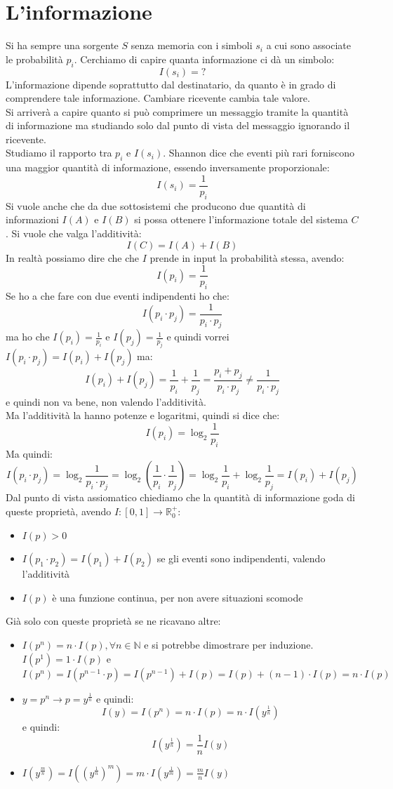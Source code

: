 \documentclass[a4paper,12pt, oneside]{book}
\begin{document}
\section{L'informazione}
Si ha sempre una sorgente $S$ senza memoria con i simboli $s_i$ a cui sono
associate le probabilità $p_i$. Cerchiamo di capire quanta informazione ci dà un
simbolo:
\[I(s_i)=?\]
L'informazione dipende soprattutto dal destinatario, da quanto è in grado di
comprendere tale informazione. Cambiare ricevente cambia tale valore.\\
Si arriverà a capire quanto si può comprimere un messaggio tramite la quantità
di informazione ma studiando solo dal punto di vista del messaggio ignorando il
ricevente.\\
Studiamo il rapporto tra $p_i$ e $I(s_i)$. Shannon dice che eventi più rari
forniscono una maggior quantità di informazione, essendo inversamente
proporzionale: 
\[I(s_i)=\frac{1}{p_i}\]
Si vuole anche che da due sottosistemi che producono due quantità di
informazioni $I(A)$ e $I(B)$ si possa ottenere l'informazione totale del
sistema $C$. Si vuole che valga l'additività:
\[I(C)=I(A)+I(B)\]
In realtà possiamo dire che che $I$ prende in input la probabilità stessa,
avendo:
\[I(p_i)=\frac{1}{p_i}\]
Se ho a che fare con due eventi indipendenti ho che:
\[I(p_i\cdot p_j)=\frac{1}{p_i\cdot p_j}\]
ma ho che $I(p_i)=\frac{1}{p_i}$ e $I(p_j)=\frac{1}{p_j}$ e quindi vorrei
$I(p_i\cdot p_j)=I(p_i)+I(p_j)$ ma:
\[I(p_i)+I(p_j)=\frac{1}{p_i}+\frac{1}{p_j}=\frac{p_i+p_j}{p_i\cdot p_j}\neq
  \frac{1}{p_i\cdot p_j}\]
e quindi non va bene, non valendo l'additività.\\
Ma l'additività la hanno potenze e logaritmi, quindi si dice che:
\[I(p_i)=\log_2\frac{1}{p_i}\]
Ma quindi:
\[I(p_i\cdot p_j)=\log_2\frac{1}{p_i\cdot
    p_j}=\log_2\left(\frac{1}{p_i}\cdot\frac{1}{p_j}\right)=
  \log_2\frac{1}{p_i}+\log_2\frac{1}{p_j}=I(p_i)+I(p_j)\]
Dal punto di vista assiomatico chiediamo che la quantità di informazione goda di
queste proprietà, avendo $I:[0,1]\to\mathbb{R}_0^+$:
\begin{itemize}
  \item $I(p)>0$
  \item $I(p_1\cdot p_2)=I(p_1)+I(p_2)$ se gli eventi sono indipendenti, valendo
  l'additività 
  \item $I(p)$ è una funzione continua, per non avere situazioni scomode
\end{itemize}
Già solo con queste proprietà se ne ricavano altre:
\begin{itemize}
  \item $I(p^n)=n\cdot I(p),\forall n\in \mathbb{N}$ e si potrebbe dimostrare
  per induzione. $I(p^1)=1\cdot I(p)$ e \[I(p^n)=I(p^{n-1}\cdot
    p)=I(p^{n-1})+I(p)=I(p)+(n-1)\cdot I(p)=n\cdot I(p)\]
  \item $y=p^n\to p=y^{\frac{1}{n}}$ e quindi:
  \[I(y)=I(p^n)=n\cdot I(p)=n\cdot I(y^{\frac{1}{n}})\]
  e quindi:
  \[I(y^{\frac{1}{n}})=\frac{1}{n}I(y)\]
  \item $I(y^\frac{m}{n})= I((y^{\frac{1}{n}})^m)=m\cdot
  I(y^{\frac{1}{m}})=\frac{m}{n}I(y)$ 
\end{itemize}
\end{document}
